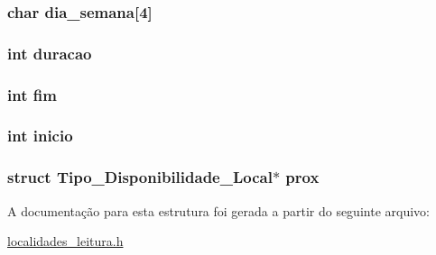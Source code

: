 \subsubsection[{dia\+\_\+semana}]{\setlength{\rightskip}{0pt plus 5cm}char dia\+\_\+semana\mbox{[}4\mbox{]}}\label{struct_tipo___disponibilidade___local_a323a88f87a558147bdcf9356fcbb6ee8}
\hypertarget{struct_tipo___disponibilidade___local_a5ff720c55f82e01378e85d9f7ac93afa}{}
\subsubsection[{duracao}]{\setlength{\rightskip}{0pt plus 5cm}int duracao}\label{struct_tipo___disponibilidade___local_a5ff720c55f82e01378e85d9f7ac93afa}
\hypertarget{struct_tipo___disponibilidade___local_a22be39504679a934aea082c76c95bb68}{}
\subsubsection[{fim}]{\setlength{\rightskip}{0pt plus 5cm}int fim}\label{struct_tipo___disponibilidade___local_a22be39504679a934aea082c76c95bb68}
\hypertarget{struct_tipo___disponibilidade___local_a73f53b0349bb995757a60c9c0bde3569}{}
\subsubsection[{inicio}]{\setlength{\rightskip}{0pt plus 5cm}int inicio}\label{struct_tipo___disponibilidade___local_a73f53b0349bb995757a60c9c0bde3569}
\hypertarget{struct_tipo___disponibilidade___local_ae62f583754f4620bf63298d1bb19dfbb}{}
\subsubsection[{prox}]{\setlength{\rightskip}{0pt plus 5cm}struct {\bf Tipo\+\_\+\+Disponibilidade\+\_\+\+Local}$\ast$ prox}\label{struct_tipo___disponibilidade___local_ae62f583754f4620bf63298d1bb19dfbb}


A documentação para esta estrutura foi gerada a partir do seguinte arquivo\+:\begin{DoxyCompactItemize}
\item 
\hyperlink{localidades__leitura_8h}{localidades\+\_\+leitura.\+h}\end{DoxyCompactItemize}
